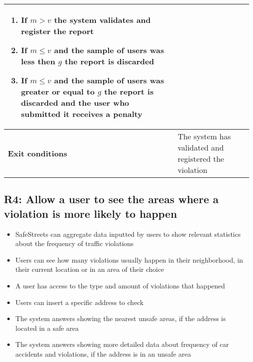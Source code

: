 \begin{description}
\begin{center}
\begin{tabular}{|p{3cm}|p{7cm}|}
\begin{enumerate}
                    \begin{enumerate}
                        \item If $m > v$ the system validates and register the report
                        \item If $m \leq v$ and the sample of users was less then $g$ the report is discarded
                        \item If $m \leq v$ and the sample of users was greater or equal to $g$ the report is discarded and the user who submitted it receives a penalty
                    \end{enumerate}
                \end{enumerate} \\
                \hline
                \textbf{Exit conditions} & The system has validated and registered the violation \\
                \hline
            \end{tabular}
        \end{center}
\end{description}

\subsection{R4: Allow a user to see the areas where a violation is more likely to happen}
\begin{itemize}
    \item SafeStreets can aggregate data inputted by users to show relevant statistics about the frequency of traffic violations
    \item Users can see how many violations usually happen in their neighborhood, in their current location or in an area of their choice
    \item A user has access to the type and amount of violations that happened
    \item Users can insert a specific address to check
    \item The system answers showing the nearest unsafe areas, if the address is located in a safe area
    \item The system answers showing more detailed data about frequency of car accidents and violations, if the address is in an unsafe area
\end{itemize}


